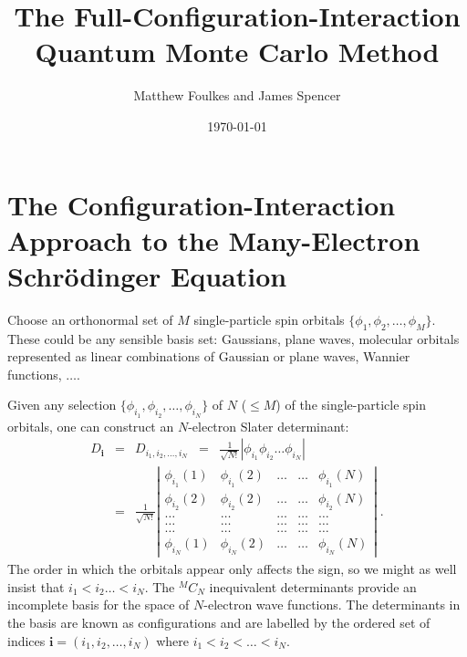 \documentclass{article}
\newcommand{\bi}{\boldsymbol{i}}
\begin{document}
\title{The Full-Configuration-Interaction Quantum Monte
  Carlo Method} 
\author{Matthew Foulkes and James Spencer}
\date{\today} \maketitle


\section{The Configuration-Interaction Approach to 
the Many-Electron Schr\"{o}dinger Equation}
\label{sec:ConfigurationInteraction}

Choose an orthonormal set of $M$ single-particle spin orbitals $\{
\phi_1, \phi_2,\ldots, \phi_M\}$. These could be any sensible basis
set: Gaussians, plane waves, molecular orbitals represented as linear
combinations of Gaussian or plane waves, Wannier functions, $\ldots$.

Given any selection $\{ \phi_{i_1}, \phi_{i_2}, \ldots, \phi_{i_N} \}$
of $N$ ($\leq M$) of the single-particle spin orbitals, one can
construct an $N$-electron Slater determinant:
\begin{eqnarray*}
D_{\bi} & = &  D_{i_1,i_2,\ldots,i_N} \;\; = \;\; 
\frac{1}{\sqrt{N!}} \left | \phi_{i_1}
\phi_{i_2}\ldots \phi_{i_N} \right | \\
& = & \frac{1}{\sqrt{N!}}\left | \begin{array}{lllll}
\phi_{i_1}(1) & \phi_{i_1}(2) & \ldots & \ldots & \phi_{i_1}(N) \\
\phi_{i_2}(2) & \phi_{i_2}(2) & \ldots & \ldots & \phi_{i_2}(N) \\
\ldots & \ldots & \ldots & \ldots & \ldots \\
\ldots & \ldots & \ldots & \ldots & \ldots \\
\ldots & \ldots & \ldots & \ldots & \ldots \\
\phi_{i_N}(1) & \phi_{i_N}(2) & \ldots & \ldots & \phi_{i_N}(N)
\end{array} \right |\;.
\end{eqnarray*}
The order in which the orbitals appear only affects the sign, so we
might as well insist that $i_1 < i_2 \ldots < i_N$. The $^MC_N$
inequivalent determinants provide an incomplete basis for the space of
$N$-electron wave functions. The determinants in the basis are known
as configurations and are labelled by the ordered set of indices $\bi
= (i_1,i_2,\ldots,i_N)$ where $i_1 < i_2 < \ldots < i_N$.
\end{document}
